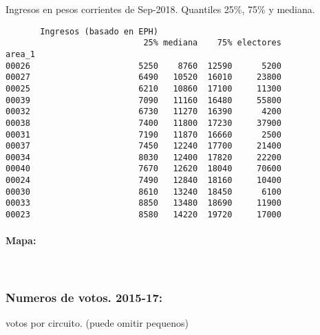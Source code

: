 \documentclass[11pt]{article}
\begin{document}
    
    Ingresos en pesos corrientes de Sep-2018. Quantiles 25\%, 75\% y
mediana.

    
    
    \begin{verbatim}
       Ingresos (basado en EPH)                         
                            25% mediana    75% electores
area_1                                                  
00026                      5250    8760  12590      5200
00027                      6490   10520  16010     23800
00025                      6210   10860  17100     11300
00039                      7090   11160  16480     55800
00032                      6730   11270  16390      4200
00038                      7400   11800  17230     37900
00031                      7190   11870  16660      2500
00037                      7450   12240  17700     21400
00034                      8030   12400  17820     22200
00040                      7670   12620  18040     70600
00024                      7490   12840  18160     10400
00030                      8610   13240  18450      6100
00033                      8850   13480  18690     11900
00023                      8580   14220  19720     17000
    \end{verbatim}

    
    \hypertarget{mapa}{%
\paragraph{Mapa:}\label{mapa}}

    
    \begin{center}
    \end{center}
    { \hspace*{\fill} \\}
    
    \hypertarget{numeros-de-votos.-2015-17}{%
\subsubsection{Numeros de votos.
2015-17:}\label{numeros-de-votos.-2015-17}}

    
    votos por circuito. (puede omitir pequenos)

    
    
\end{document}
